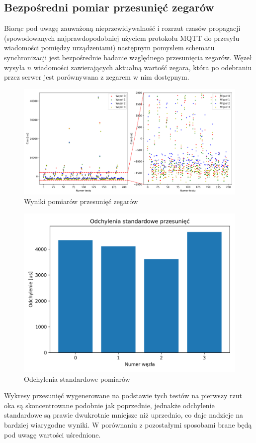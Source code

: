 \subsection{Bezpośredni pomiar przesunięć zegarów}\label{sec:time_deltas_sync}

Biorąc pod uwagę zauważoną nieprzewidywalność i rozrzut czasów propagacji (spowodowanych najprawdopodobniej użyciem protokołu MQTT do przesyłu wiadomości pomiędzy urządzeniami) następnym pomysłem schematu synchronizacji jest bezpośrednie badanie względnego przesunięcia zegarów. Węzeł wysyła $n$ wiadomości zawierających aktualną wartość zegara, która po odebraniu przez serwer jest porównywana z zegarem w nim dostępnym.

\begin{figure}[H]
\centering
    \includegraphics[width=\textwidth]{pics/time_deltas/time_deltas.png}
\caption{Wyniki pomiarów przesunięć zegarów}
\label{pic:offsets_deltas}
\end{figure}

\begin{figure}[H]
\centering
    \includegraphics[width=.49\textwidth]{pics/time_deltas/stddev.png}
\caption{Odchylenia standardowe pomiarów}
\label{pic:stddev_deltas}
\end{figure}

Wykresy przesunięć wygenerowane na podstawie tych testów na pierwszy rzut oka są skoncentrowane podobnie jak poprzednie, jednakże odchylenie standardowe są prawie dwukrotnie mniejsze niż uprzednio, co daje nadzieje na bardziej wiarygodne wyniki. W porównaniu z pozostałymi sposobami brane będą pod uwagę wartości uśrednione.

